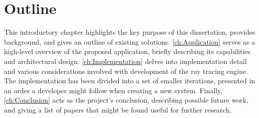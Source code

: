 \section{Outline}

This introductory chapter highlights the key purpose of this dissertation, provides background, and gives an outline of existing solutions. 
\cref{ch:Application} serves as a high-level overview of the proposed application, briefly describing its capabilities and architectural design. 
\cref{ch:Implementation} delves into implementation detail and various considerations involved with development of the ray tracing engine. 
The implementation has been divided into a set of smaller iterations, presented in an order a developer might follow when creating a new system.
Finally, \cref{ch:Conclusion} acts as the project's conclusion, describing possible future work, and giving a list of papers that might be found useful for further research.
